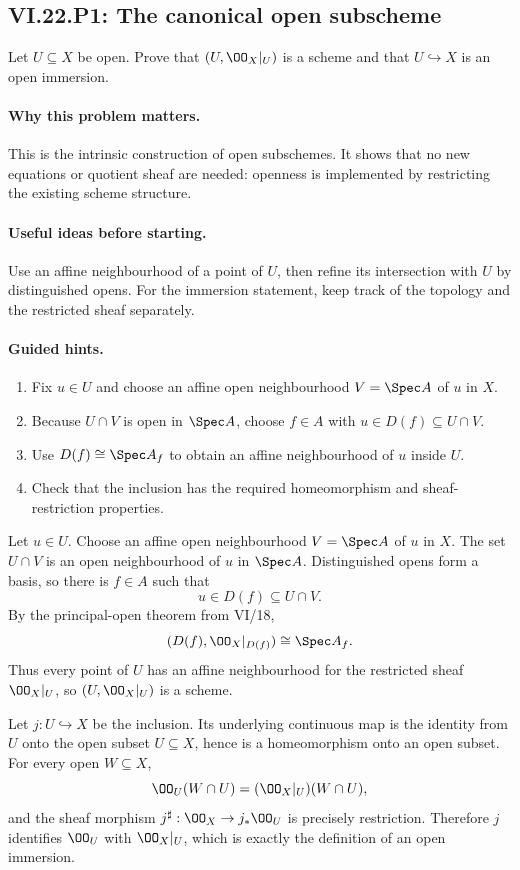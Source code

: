 \subsection*{VI.22.P1: The canonical open subscheme}
\begin{problem}\label{prob:vi22-p01}
Let $U\subseteq X$ be open.  Prove that $(U,\OO_X|_U)$ is a scheme and that $U\hookrightarrow X$ is an open immersion.
\end{problem}

\ifdefined\FullProblemDossiers
\paragraph{Why this problem matters.}
This is the intrinsic construction of open subschemes.  It shows that no new equations or quotient sheaf are needed: openness is implemented by restricting the existing scheme structure.

\paragraph{Useful ideas before starting.}
Use an affine neighbourhood of a point of $U$, then refine its intersection with $U$ by distinguished opens.  For the immersion statement, keep track of the topology and the restricted sheaf separately.

\paragraph{Guided hints.}
\begin{enumerate}
\item Fix $u\in U$ and choose an affine open neighbourhood $V=\Spec A$ of $u$ in $X$.
\item Because $U\cap V$ is open in $\Spec A$, choose $f\in A$ with $u\in D(f)\subseteq U\cap V$.
\item Use $D(f)\cong\Spec A_f$ to obtain an affine neighbourhood of $u$ inside $U$.
\item Check that the inclusion has the required homeomorphism and sheaf-restriction properties.
\end{enumerate}

\begin{solution}
Let $u\in U$.  Choose an affine open neighbourhood $V=\Spec A$ of $u$ in $X$.
The set $U\cap V$ is an open neighbourhood of $u$ in $\Spec A$.  Distinguished opens form a
basis, so there is $f\in A$ such that
\[
 u\in D(f)\subseteq U\cap V.
\]
By the principal-open theorem from VI/18,
\[
 (D(f),\OO_X|_{D(f)})\cong\Spec A_f.
\]
Thus every point of $U$ has an affine neighbourhood for the restricted sheaf
$\OO_X|_U$, so $(U,\OO_X|_U)$ is a scheme.

Let $j:U\hookrightarrow X$ be the inclusion.  Its underlying continuous map is the identity
from $U$ onto the open subset $U\subseteq X$, hence is a homeomorphism onto an open subset.
For every open $W\subseteq X$,
\[
 \OO_U(W\cap U)=(\OO_X|_U)(W\cap U),
\]
and the sheaf morphism $j^\sharp:\OO_X\to j_*\OO_U$ is precisely restriction.  Therefore
$j$ identifies $\OO_U$ with $\OO_X|_U$, which is exactly the definition of an open immersion.
\end{solution}

